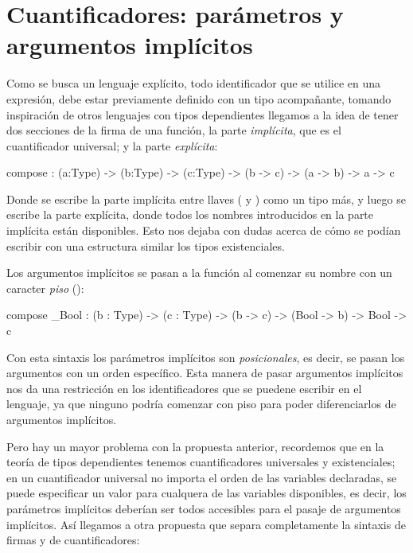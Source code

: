 \section{Cuantificadores: parámetros y argumentos implícitos}

\begin{designfr}
Como se busca un lenguaje explícito, todo identificador que se utilice en una expresión, debe estar previamente definido con un tipo acompañante, tomando inspiración de otros lenguajes con tipos dependientes llegamos a la idea de tener dos secciones de la firma de una función, la parte \emph{implícita}, que es el cuantificador universal; y la parte \emph{explícita}:

\begin{anglercode}
compose : { (a:Type) -> (b:Type) -> (c:Type) } -> (b -> c) -> (a -> b) -> a -> c
\end{anglercode}

Donde se escribe la parte implícita entre llaves (\inlinecode{\{} y \inlinecode{\}}) como un tipo más, y luego se escribe la parte explícita, donde todos los nombres introducidos en la parte implícita están disponibles. Esto nos dejaba con dudas acerca de cómo se podían escribir con una estructura similar los tipos existenciales.

Los argumentos implícitos se pasan a la función al comenzar su nombre con un caracter \emph{piso} (\inlinecode{\_}):

\begin{anglercode}
compose _Bool : { (b : Type) -> (c : Type) } -> (b -> c) -> (Bool -> b) -> Bool -> c
\end{anglercode}

Con esta sintaxis los parámetros implícitos son \emph{posicionales}, es decir, se pasan los argumentos con un orden específico. Esta manera de pasar argumentos implícitos nos da una restricción en los identificadores que se puedene escribir en el lenguaje, ya que ninguno podría comenzar con piso para poder diferenciarlos de argumentos implícitos.

Pero hay un mayor problema con la propuesta anterior, recordemos que en la teoría de tipos dependientes tenemos cuantificadores universales y existenciales; en un cuantificador universal no importa el orden de las variables declaradas, se puede especificar un valor para cualquera de las variables disponibles, es decir, los parámetros implícitos deberían ser todos accesibles para el pasaje de argumentos implícitos. Así llegamos a otra propuesta que separa completamente la sintaxis de firmas y de cuantificadores:


\end{designfr}

